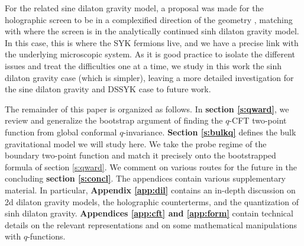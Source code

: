 \documentclass[a4paper,titlepage,12pt]{article}
\numberwithin{equation}{section}
\begin{document}
For the related sine dilaton gravity model, a proposal was made for the holographic screen to be in a complexified direction of the geometry \cite{Blommaert:2024ymv}, matching with where the screen is in the analytically continued sinh dilaton gravity model. In this case, this is where the SYK fermions live, and we have a precise link with the underlying microscopic system. As it is good practice to isolate the different issues and treat the difficulties one at a time, we study in this work the sinh dilaton gravity case (which is simpler), leaving a more detailed investigation for the sine dilaton gravity and DSSYK case to future work.

The remainder of this paper is organized as follows.
In \textbf{section \ref{s:qward}}, we review and generalize the bootstrap argument of finding the $q$-CFT two-point function from global conformal $q$-invariance. \textbf{Section \ref{s:bulkq}} defines the bulk gravitational model we will study here. We take the probe regime of the boundary two-point function and match it precisely onto the bootstrapped formula of section \ref{s:qward}. We comment on various routes for the future in the concluding \textbf{section \ref{s:concl}}.
The appendices contain various supplementary material. In particular, \textbf{Appendix \ref{app:dil}} contains an in-depth discussion on 2d dilaton gravity models, the holographic counterterms, and the quantization of sinh dilaton gravity. \textbf{Appendices \ref{app:cft} and \ref{app:form}} contain technical details on the relevant representations and on some mathematical manipulations with $q$-functions.
\end{document}
